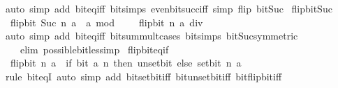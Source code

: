 \begin{isabellebody}
%
\isatagproof
{}\isamarkupfalse%
\ {\isacharparenleft}{\kern0pt}auto\ simp\ add{\isacharcolon}{\kern0pt}\ bit{\isacharunderscore}{\kern0pt}eq{\isacharunderscore}{\kern0pt}iff\ bit{\isacharunderscore}{\kern0pt}simps\ even{\isacharunderscore}{\kern0pt}bit{\isacharunderscore}{\kern0pt}succ{\isacharunderscore}{\kern0pt}iff\ simp\ flip{\isacharcolon}{\kern0pt}\ bit{\isacharunderscore}{\kern0pt}Suc{\isacharparenright}{\kern0pt}%
\endisatagproof
{\isafoldproof}%
%
\isadelimproof
\isanewline
%
\endisadelimproof
\isanewline
{}\isamarkupfalse%
\ flip{\isacharunderscore}{\kern0pt}bit{\isacharunderscore}{\kern0pt}Suc{\isacharcolon}{\kern0pt}\isanewline
\ \ {\isacartoucheopen}flip{\isacharunderscore}{\kern0pt}bit\ {\isacharparenleft}{\kern0pt}Suc\ n{\isacharparenright}{\kern0pt}\ a\ {\isacharequal}{\kern0pt}\ a\ mod\ {}\ {\isacharplus}{\kern0pt}\ {}\ {\isacharasterisk}{\kern0pt}\ flip{\isacharunderscore}{\kern0pt}bit\ n\ {\isacharparenleft}{\kern0pt}a\ div\ {}{\isacharparenright}{\kern0pt}{\isacartoucheclose}\isanewline
%
\isadelimproof
\ \ %
\endisadelimproof
%
\isatagproof
{}\isamarkupfalse%
\ {\isacharparenleft}{\kern0pt}auto\ simp\ add{\isacharcolon}{\kern0pt}\ bit{\isacharunderscore}{\kern0pt}eq{\isacharunderscore}{\kern0pt}iff\ bit{\isacharunderscore}{\kern0pt}sum{\isacharunderscore}{\kern0pt}mult{\isacharunderscore}{\kern0pt}{}{\isacharunderscore}{\kern0pt}cases\ bit{\isacharunderscore}{\kern0pt}simps\ bit{\isacharunderscore}{\kern0pt}Suc{\isacharbrackleft}{\kern0pt}symmetric{\isacharbrackright}{\kern0pt}\isanewline
\ \ \ \ elim{\isacharcolon}{\kern0pt}\ possible{\isacharunderscore}{\kern0pt}bit{\isacharunderscore}{\kern0pt}less{\isacharunderscore}{\kern0pt}imp{\isacharparenright}{\kern0pt}%
\endisatagproof
{\isafoldproof}%
%
\isadelimproof
\isanewline
%
\endisadelimproof
\isanewline
{}\isamarkupfalse%
\ flip{\isacharunderscore}{\kern0pt}bit{\isacharunderscore}{\kern0pt}eq{\isacharunderscore}{\kern0pt}if{\isacharcolon}{\kern0pt}\isanewline
\ \ {\isacartoucheopen}flip{\isacharunderscore}{\kern0pt}bit\ n\ a\ {\isacharequal}{\kern0pt}\ {\isacharparenleft}{\kern0pt}if\ bit\ a\ n\ then\ unset{\isacharunderscore}{\kern0pt}bit\ else\ set{\isacharunderscore}{\kern0pt}bit{\isacharparenright}{\kern0pt}\ n\ a{\isacartoucheclose}\isanewline
%
\isadelimproof
\ \ %
\endisadelimproof
%
\isatagproof
{}\isamarkupfalse%
\ {\isacharparenleft}{\kern0pt}rule\ bit{\isacharunderscore}{\kern0pt}eqI{\isacharparenright}{\kern0pt}\ {\isacharparenleft}{\kern0pt}auto\ simp\ add{\isacharcolon}{\kern0pt}\ bit{\isacharunderscore}{\kern0pt}set{\isacharunderscore}{\kern0pt}bit{\isacharunderscore}{\kern0pt}iff\ bit{\isacharunderscore}{\kern0pt}unset{\isacharunderscore}{\kern0pt}bit{\isacharunderscore}{\kern0pt}iff\ bit{\isacharunderscore}{\kern0pt}flip{\isacharunderscore}{\kern0pt}bit{\isacharunderscore}{\kern0pt}iff{\isacharparenright}{\kern0pt}%

\end{isabellebody}
